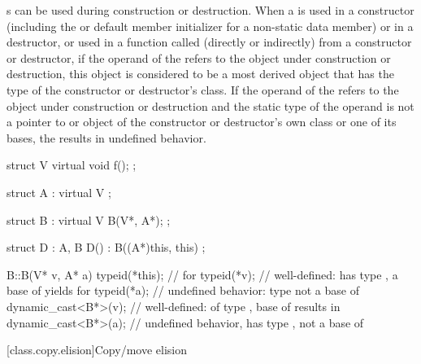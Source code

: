 \pnum
{}%
%
%
%
s can be used during construction
or destruction. When a
is used in a constructor (including the
 or default member initializer
for a non-static data member)
or in a destructor, or used in a function called (directly or indirectly) from
a constructor or destructor, if the operand of the
refers to the object under construction or destruction, this object is
considered to be a most derived object that has the type of the constructor or
destructor's class.
If the operand of the
refers to the object under construction or destruction and the static type of
the operand is not a pointer to or object of the constructor or destructor's
own class or one of its bases, the
results in undefined behavior.
\begin{example}
\begin{codeblock}
struct V {
  virtual void f();
};

struct A : virtual V { };

struct B : virtual V {
  B(V*, A*);
};

struct D : A, B {
  D() : B((A*)this, this) { }
};

B::B(V* v, A* a) {
  typeid(*this);                //  for 
  typeid(*v);                   // well-defined:  has type , a base of  yields  for 
  typeid(*a);                   // undefined behavior: type  not a base of 
  dynamic_cast<B*>(v);          // well-defined:  of type ,  base of  results in 
  dynamic_cast<B*>(a);          // undefined behavior,  has type ,  not a base of 
}
\end{codeblock}
\end{example}
%
%

[class.copy.elision]{Copy/move elision}%

